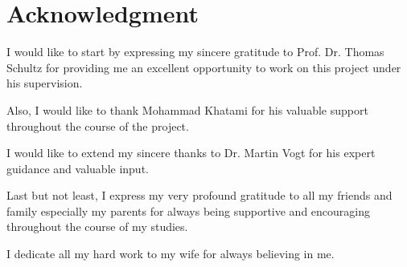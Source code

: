 \documentclass[../structure.tex]{subfiles}
\begin{document}
\chapter*{Acknowledgment}

\quad I would like to start by expressing my sincere gratitude to Prof. Dr. Thomas Schultz 
for providing me an excellent opportunity to work on this project under his supervision.

Also, I would like to thank Mohammad Khatami for his valuable support throughout the course of the project.

I would like to extend my sincere thanks to Dr. Martin Vogt for his expert guidance and valuable input.

Last but not least, I express my very profound gratitude to all my friends
and family especially my parents for always being supportive and encouraging throughout the course of my studies.

I dedicate all my hard work to my wife for always believing in me.
\end{document}
